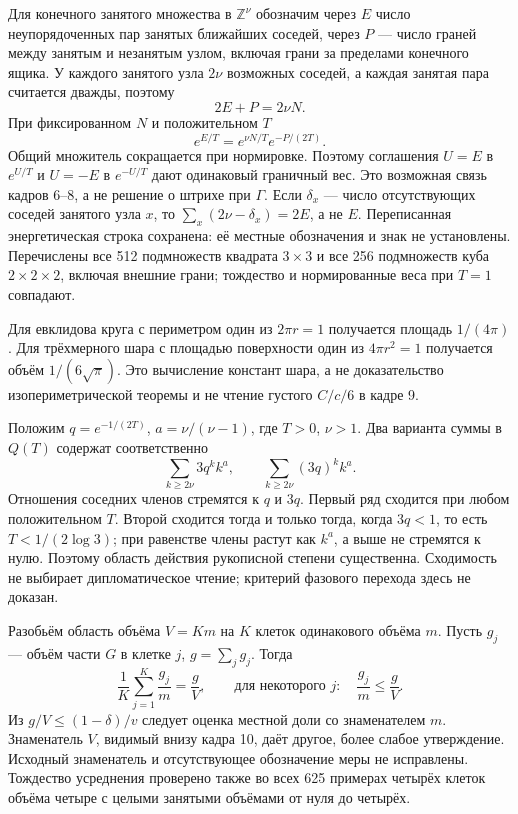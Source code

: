 \documentclass[11pt]{article}
\begin{document}
Для конечного занятого множества в \(\mathbb Z^\nu\) обозначим через \(E\) число неупорядоченных пар занятых ближайших соседей, через \(P\) — число граней между занятым и незанятым узлом, включая грани за пределами конечного ящика. У каждого занятого узла \(2\nu\) возможных соседей, а каждая занятая пара считается дважды, поэтому
\[2E+P=2\nu N.\]
При фиксированном \(N\) и положительном \(T\)
\[e^{E/T}=e^{\nu N/T}e^{-P/(2T)}.\]
Общий множитель сокращается при нормировке. Поэтому соглашения \(U=E\) в \(e^{U/T}\) и \(U=-E\) в \(e^{-U/T}\) дают одинаковый граничный вес. Это возможная связь кадров 6–8, а не решение о штрихе при \(\Gamma\). Если \(\delta_x\) — число отсутствующих соседей занятого узла \(x\), то \(\sum_x(2\nu-\delta_x)=2E\), а не \(E\). Переписанная энергетическая строка сохранена: её местные обозначения и знак не установлены. Перечислены все 512 подмножеств квадрата \(3\times3\) и все 256 подмножеств куба \(2\times2\times2\), включая внешние грани; тождество и нормированные веса при \(T=1\) совпадают.

Для евклидова круга с периметром один из \(2\pi r=1\) получается площадь \(1/(4\pi)\). Для трёхмерного шара с площадью поверхности один из \(4\pi r^2=1\) получается объём \(1/(6\sqrt\pi)\). Это вычисление констант шара, а не доказательство изопериметрической теоремы и не чтение густого \(C/c/6\) в кадре 9.

Положим \(q=e^{-1/(2T)}\), \(a=\nu/(\nu-1)\), где \(T>0\), \(\nu>1\). Два варианта суммы в \(Q(T)\) содержат соответственно
\[\sum_{k\ge2\nu}3q^k k^a,\qquad
 \sum_{k\ge2\nu}(3q)^k k^a.\]
Отношения соседних членов стремятся к \(q\) и \(3q\). Первый ряд сходится при любом положительном \(T\). Второй сходится тогда и только тогда, когда \(3q<1\), то есть \(T<1/(2\log3)\); при равенстве члены растут как \(k^a\), а выше не стремятся к нулю. Поэтому область действия рукописной степени существенна. Сходимость не выбирает дипломатическое чтение; критерий фазового перехода здесь не доказан.

Разобьём область объёма \(V=Km\) на \(K\) клеток одинакового объёма \(m\). Пусть \(g_j\) — объём части \(G\) в клетке \(j\), \(g=\sum_jg_j\). Тогда
\[\frac1K\sum_{j=1}^K\frac{g_j}{m}=\frac gV,\qquad
 \text{для некоторого }j:\quad\frac{g_j}{m}\le\frac gV.\]
Из \(g/V\le(1-\delta)/v\) следует оценка местной доли со знаменателем \(m\). Знаменатель \(V\), видимый внизу кадра 10, даёт другое, более слабое утверждение. Исходный знаменатель и отсутствующее обозначение меры не исправлены. Тождество усреднения проверено также во всех 625 примерах четырёх клеток объёма четыре с целыми занятыми объёмами от нуля до четырёх.
\end{document}

